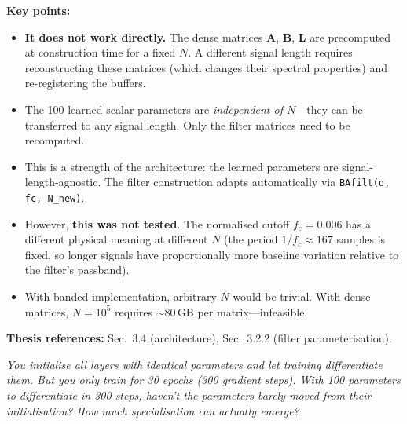 \documentclass[11pt, letterpaper]{article}
\newcounter{qcounter}
\newcommand{\question}[1]{%
  \stepcounter{qcounter}%
  \begin{questionbox}[Q\theqcounter]%
    \itshape #1%
  \end{questionbox}%
}
\begin{document}
\begin{answerbox}
\textbf{Key points:}
\begin{itemize}[nosep]
  \item \textbf{It does not work directly.}  The dense matrices
        $\mathbf{A}$, $\mathbf{B}$, $\mathbf{L}$ are precomputed at
        construction time for a fixed $N$.  A different signal length
        requires reconstructing these matrices (which changes their
        spectral properties) and re-registering the buffers.
  \item The 100 learned scalar parameters are \emph{independent of
        $N$}---they can be transferred to any signal length.  Only the
        filter matrices need to be recomputed.
  \item This is a strength of the architecture: the learned
        parameters are signal-length-agnostic.  The filter construction
        adapts automatically via \texttt{BAfilt(d, fc, N\_new)}.
  \item However, \textbf{this was not tested}.  The normalised cutoff
        $f_c{=}0.006$ has a different physical meaning at different $N$
        (the period $1/f_c \approx 167$ samples is fixed, so longer
        signals have proportionally more baseline variation relative
        to the filter's passband).
  \item With banded implementation, arbitrary $N$ would be trivial.
        With dense matrices, $N{=}10^5$ requires $\sim$80\,GB per
        matrix---infeasible.
\end{itemize}
\textbf{Thesis references:} Sec.~3.4 (architecture), Sec.~3.2.2 (filter parameterisation).
\end{answerbox}

\question{You initialise all layers with identical parameters and let
training differentiate them.  But you only train for 30 epochs
(300 gradient steps).  With 100 parameters to differentiate in
300 steps, haven't the parameters barely moved from their
initialisation?  How much specialisation can actually emerge?}
\end{document}
